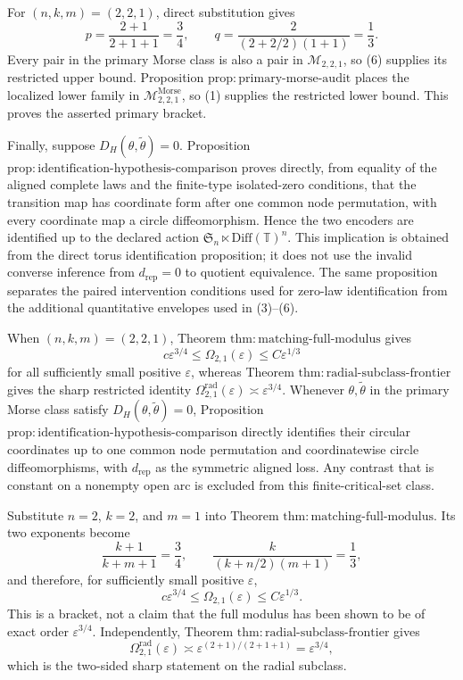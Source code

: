 For \((n,k,m)=(2,2,1)\), direct substitution gives
\[
p=\frac{2+1}{2+1+1}=\frac34,
\qquad
q=\frac{2}{(2+2/2)(1+1)}=\frac13.
\tag{7}
\]
Every pair in the primary Morse class is also a pair in \(\mathcal M_{2,2,1}\), so (6) supplies its restricted upper bound. Proposition \(\mathrm{prop:primary\text{-}morse\text{-}audit}\) places the localized lower family in \(\mathcal M^{\mathrm{Morse}}_{2,2,1}\), so (1) supplies the restricted lower bound. This proves the asserted primary bracket.

Finally, suppose \(D_H(\theta,\widetilde\theta)=0\). Proposition \(\mathrm{prop:identification\text{-}hypothesis\text{-}comparison}\) proves directly, from equality of the aligned complete laws and the finite-type isolated-zero conditions, that the transition map has coordinate form after one common node permutation, with every coordinate map a circle diffeomorphism. Hence the two encoders are identified up to the declared action \(\mathfrak S_n\ltimes\mathrm{Diff}(\mathbb T)^n\). This implication is obtained from the direct torus identification proposition; it does not use the invalid converse inference from \(d_{\mathrm{rep}}=0\) to quotient equivalence. The same proposition separates the paired intervention conditions used for zero-law identification from the additional quantitative envelopes used in (3)--(6).

When \((n,k,m)=(2,2,1)\), Theorem \(\mathrm{thm:matching\text{-}full\text{-}modulus}\) gives
\[
c\varepsilon^{3/4}
\leq\Omega_{2,1}(\varepsilon)
\leq C\varepsilon^{1/3}
\]
for all sufficiently small positive \(\varepsilon\), whereas Theorem \(\mathrm{thm:radial\text{-}subclass\text{-}frontier}\) gives the sharp restricted identity \(\Omega_{2,1}^{\mathrm{rad}}(\varepsilon)\asymp\varepsilon^{3/4}\). Whenever \(\theta,\widetilde\theta\) in the primary Morse class satisfy \(D_H(\theta,\widetilde\theta)=0\), Proposition \(\mathrm{prop:identification\text{-}hypothesis\text{-}comparison}\) directly identifies their circular coordinates up to one common node permutation and coordinatewise circle diffeomorphisms, with \(d_{\mathrm{rep}}\) as the symmetric aligned loss. Any contrast that is constant on a nonempty open arc is excluded from this finite-critical-set class.

Substitute \(n=2\), \(k=2\), and \(m=1\) into Theorem \(\mathrm{thm:matching\text{-}full\text{-}modulus}\). Its two exponents become
\[
\frac{k+1}{k+m+1}=\frac34,
\qquad
\frac{k}{(k+n/2)(m+1)}=\frac13,
\]
and therefore, for sufficiently small positive \(\varepsilon\),
\[
c\varepsilon^{3/4}
\leq\Omega_{2,1}(\varepsilon)
\leq C\varepsilon^{1/3}.
\tag{1}
\]
This is a bracket, not a claim that the full modulus has been shown to be of exact order \(\varepsilon^{3/4}\). Independently, Theorem \(\mathrm{thm:radial\text{-}subclass\text{-}frontier}\) gives
\[
\Omega_{2,1}^{\mathrm{rad}}(\varepsilon)
\asymp
\varepsilon^{(2+1)/(2+1+1)}
=\varepsilon^{3/4},
\tag{2}
\]
which is the two-sided sharp statement on the radial subclass.

